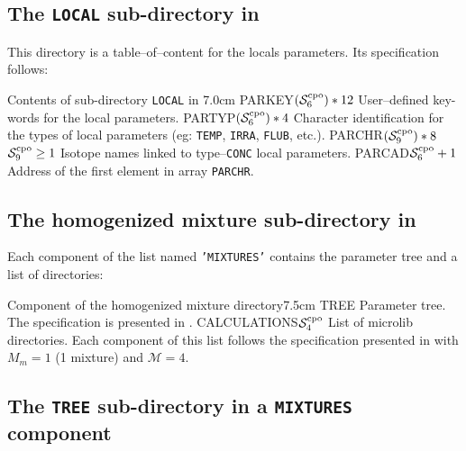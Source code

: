 \subsection{The {\tt LOCAL} sub-directory in }\label{sect:cpodirlocal}

This directory is a table--of--content for the locals parameters. Its
specification follows:

\begin{DescriptionEnregistrement}{Contents of sub-directory {\tt LOCAL} in
}{7.0cm}
\label{tabl:tabloc}
\CharEnr
  {PARKEY}{$(\mathcal{S}^{\rm cpo}_{6})*12$}
  {User--defined key-words for the local parameters.}
\CharEnr
  {PARTYP}{$(\mathcal{S}^{\rm cpo}_{6})*4$}
  {Character identification for the types of local parameters (eg: {\tt TEMP}, {\tt IRRA}, {\tt FLUB},
  etc.).}
\OptCharEnr
  {PARCHR}{$(\mathcal{S}^{\rm cpo}_{9})*8$}{$\mathcal{S}^{\rm cpo}_{9}\ge 1$}
  {Isotope names linked to type--{\tt CONC} local parameters.}
\IntEnr
  {PARCAD}{$\mathcal{S}^{\rm cpo}_{6}+1$}
  {Address of the first element in array {\tt PARCHR}.}
\end{DescriptionEnregistrement}

\subsection{The homogenized mixture sub-directory in }\label{sect:homomix}

Each component of the list named {\tt 'MIXTURES'} contains the parameter tree and a list of
directories:

\begin{DescriptionEnregistrement}{Component of the homogenized mixture directory}{7.5cm}
\label{tabl:mixture_cpo}
\DirEnr
  {TREE}
  {Parameter tree. The specification is presented in .}
\DirlEnr
  {CALCULATIONS}{$\mathcal{S}^{\rm cpo}_{4}$}
  {List of {\sc microlib} directories. Each component of this list follows the specification
   presented in  with $M_{m}=1$ (1 mixture) and $\mathcal{M}=4$.}
\end{DescriptionEnregistrement}

\subsection{The {\tt TREE} sub-directory in a {\tt MIXTURES} component}\label{sect:cpodirtree}

